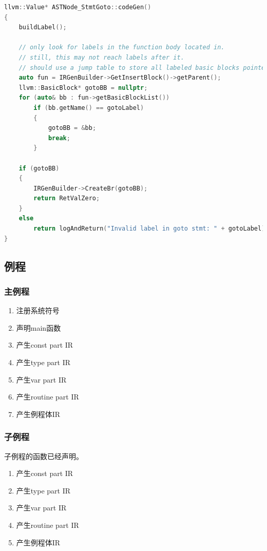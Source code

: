 \documentclass{article}
\begin{document}
\begin{lstlisting}[language=C++]
llvm::Value* ASTNode_StmtGoto::codeGen()
{
    buildLabel();

    // only look for labels in the function body located in.
    // still, this may not reach labels after it.
    // should use a jump table to store all labeled basic blocks pointers.
    auto fun = IRGenBuilder->GetInsertBlock()->getParent();
    llvm::BasicBlock* gotoBB = nullptr;
    for (auto& bb : fun->getBasicBlockList())
        if (bb.getName() == gotoLabel)
        {
            gotoBB = &bb;
            break;
        }

    if (gotoBB)
    {
        IRGenBuilder->CreateBr(gotoBB);
        return RetValZero;
    }
    else
        return logAndReturn("Invalid label in goto stmt: " + gotoLabel);
}
\end{lstlisting}

\subsection{例程}
\subsubsection{主例程}
\begin{enumerate}
  \item 注册系统符号
  \item 声明main函数
  \item 产生const part IR
  \item 产生type part IR
  \item 产生var part IR
  \item 产生routine part IR
  \item 产生例程体IR
\end{enumerate}
\subsubsection{子例程}
\par 子例程的函数已经声明。
\begin{enumerate}
  \item 产生const part IR
  \item 产生type part IR
  \item 产生var part IR
  \item 产生routine part IR
  \item 产生例程体IR
\end{enumerate}
\end{document}
